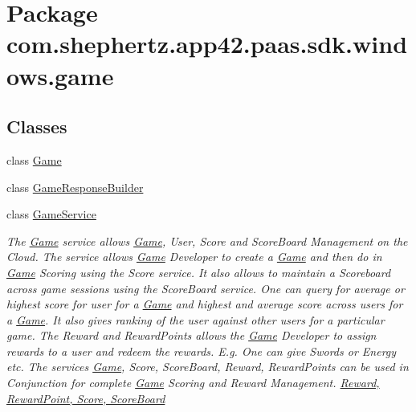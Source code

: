 \hypertarget{namespacecom_1_1shephertz_1_1app42_1_1paas_1_1sdk_1_1windows_1_1game}{\section{Package com.\+shephertz.\+app42.\+paas.\+sdk.\+windows.\+game}
\label{namespacecom_1_1shephertz_1_1app42_1_1paas_1_1sdk_1_1windows_1_1game}
}
\subsection*{Classes}
\begin{DoxyCompactItemize}
\item 
class \hyperlink{classcom_1_1shephertz_1_1app42_1_1paas_1_1sdk_1_1windows_1_1game_1_1_game}{Game}
\item 
class \hyperlink{classcom_1_1shephertz_1_1app42_1_1paas_1_1sdk_1_1windows_1_1game_1_1_game_response_builder}{Game\+Response\+Builder}
\item 
class \hyperlink{classcom_1_1shephertz_1_1app42_1_1paas_1_1sdk_1_1windows_1_1game_1_1_game_service}{Game\+Service}
\begin{DoxyCompactList}\small\item\em The \hyperlink{classcom_1_1shephertz_1_1app42_1_1paas_1_1sdk_1_1windows_1_1game_1_1_game}{Game} service allows \hyperlink{classcom_1_1shephertz_1_1app42_1_1paas_1_1sdk_1_1windows_1_1game_1_1_game}{Game}, User, Score and Score\+Board Management on the Cloud. The service allows \hyperlink{classcom_1_1shephertz_1_1app42_1_1paas_1_1sdk_1_1windows_1_1game_1_1_game}{Game} Developer to create a \hyperlink{classcom_1_1shephertz_1_1app42_1_1paas_1_1sdk_1_1windows_1_1game_1_1_game}{Game} and then do in \hyperlink{classcom_1_1shephertz_1_1app42_1_1paas_1_1sdk_1_1windows_1_1game_1_1_game}{Game} Scoring using the Score service. It also allows to maintain a Scoreboard across game sessions using the Score\+Board service. One can query for average or highest score for user for a \hyperlink{classcom_1_1shephertz_1_1app42_1_1paas_1_1sdk_1_1windows_1_1game_1_1_game}{Game} and highest and average score across users for a \hyperlink{classcom_1_1shephertz_1_1app42_1_1paas_1_1sdk_1_1windows_1_1game_1_1_game}{Game}. It also gives ranking of the user against other users for a particular game. The Reward and Reward\+Points allows the \hyperlink{classcom_1_1shephertz_1_1app42_1_1paas_1_1sdk_1_1windows_1_1game_1_1_game}{Game} Developer to assign rewards to a user and redeem the rewards. E.\+g. One can give Swords or Energy etc. The services \hyperlink{classcom_1_1shephertz_1_1app42_1_1paas_1_1sdk_1_1windows_1_1game_1_1_game}{Game}, Score, Score\+Board, Reward, Reward\+Points can be used in Conjunction for complete \hyperlink{classcom_1_1shephertz_1_1app42_1_1paas_1_1sdk_1_1windows_1_1game_1_1_game}{Game} Scoring and Reward Management. \hyperlink{classcom_1_1shephertz_1_1app42_1_1paas_1_1sdk_1_1windows_1_1game_1_1_game_service}{Reward, Reward\+Point, Score, Score\+Board} \end{DoxyCompactList}\item 

\end{DoxyCompactItemize}
